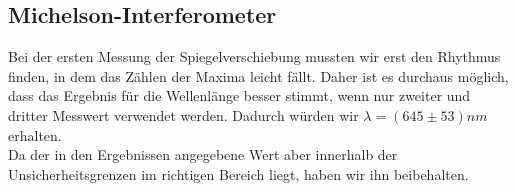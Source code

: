 \documentclass{article}
\begin{document}
\subsection{Michelson-Interferometer}
Bei der ersten Messung der Spiegelverschiebung mussten wir erst den Rhythmus finden, in dem das Zählen der Maxima leicht fällt. Daher ist es durchaus möglich, dass das Ergebnis für die Wellenlänge besser stimmt, wenn nur zweiter und dritter Messwert verwendet werden. Dadurch würden wir $\lambda=(645 \pm 53)nm$ erhalten.\\
Da der in den Ergebnissen angegebene Wert aber innerhalb der Unsicherheitsgrenzen im richtigen Bereich liegt, haben wir ihn beibehalten.
																								
\end{document}
